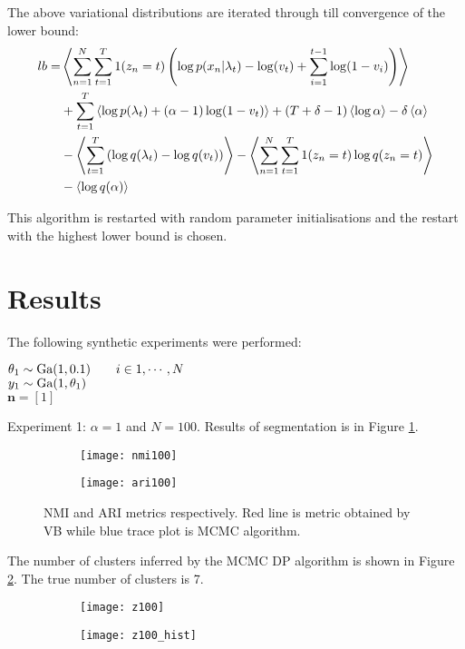 \documentclass{article}
\begin{document}
The above variational distributions are iterated through till convergence of the lower bound:
\begin{align}
\nonumber lb=&\left\langle\sum_{n=1}^{N}\sum_{t=1}^{T} 1(z_n=t)\left(\log p(x_n|\lambda_t)-\log(v_t)+\sum_{i=1}^{t-1}\log(1-v_i)\right)\right\rangle\\
\nonumber &+\sum_{t=1}^{T} \left\langle\log p(\lambda_t)+(\alpha-1)\log(1-v_t)\right\rangle+(T+\delta-1)\left\langle\log\alpha\right\rangle-\delta\left\langle\alpha\right\rangle\\
\nonumber &-\left\langle\sum_{t=1}^{T}\left(\log q(\lambda_t)-\log q(v_t)\right)\right\rangle-\left\langle\sum_{n=1}^{N}\sum_{t=1}^{T} 1(z_n=t)\log q(z_n=t)\right\rangle\\
&-\left\langle\log q(\alpha)\right\rangle
\end{align}

This algorithm is restarted with random parameter initialisations and the restart with the highest lower bound is chosen.

\clearpage
\section{Results}
The following synthetic experiments were performed:

\begin{algorithm}
    $\theta_1\sim {\text{Ga}}(1,0.1) \qquad i\in{1,\cdots,N}$\\
    $y_1\sim {\text{Ga}}(1, \theta_1)$\\
    $\mathbf{n}=[1]$\\
\end{algorithm}

Experiment 1: $\alpha=1$ and $N=100$. Results of segmentation is in Figure \ref{fig:N100}.
\begin{figure}[h]
\centering
\begin{subfigure}{0.4\textwidth}
\texttt{[image: nmi100]}
\caption{}
\end{subfigure}
\begin{subfigure}{0.4\textwidth}
\texttt{[image: ari100]}
\caption{}
\end{subfigure}
\caption{NMI and ARI metrics respectively. Red line is metric obtained by VB while blue trace plot is MCMC algorithm.}
\label{fig:N100}
\end{figure}
The number of clusters inferred by the MCMC DP algorithm is shown in Figure \ref{fig:z100}. The true number of clusters is 7.
\begin{figure}[h]
\centering
\begin{subfigure}{0.4\textwidth}
\texttt{[image: z100]}
\caption{}
\end{subfigure}
\begin{subfigure}{0.4\textwidth}
\texttt{[image: z100\_hist]}
\caption{}
\end{subfigure}
\caption{}
\label{fig:z100}
\end{figure}
\end{document}
